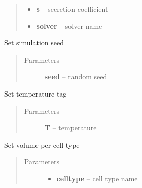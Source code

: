 \documentclass[letterpaper,10pt,english]{sphinxmanual}
\begin{document}
\begin{fulllineitems}
\begin{fulllineitems}
\begin{quote}
\begin{description}
\begin{itemize}
\item {} 
\textbf{s} -- secretion coefficient

\item {} 
\textbf{solver} -- solver name

\end{itemize}

\end{description}\end{quote}

\end{fulllineitems}


\begin{fulllineitems}
\label{Experiment:Experiment.Experiment.setSeed}
Set simulation seed
\begin{quote}\begin{description}
\item[{Parameters}] \leavevmode
\textbf{seed} -- random seed

\end{description}\end{quote}

\end{fulllineitems}


\begin{fulllineitems}
\label{Experiment:Experiment.Experiment.setTemp}
Set temperature tag
\begin{quote}\begin{description}
\item[{Parameters}] \leavevmode
\textbf{T} -- temperature

\end{description}\end{quote}

\end{fulllineitems}


\begin{fulllineitems}
\label{Experiment:Experiment.Experiment.setVolume}
Set volume per cell type
\begin{quote}\begin{description}
\item[{Parameters}] \leavevmode\begin{itemize}
\item {} 
\textbf{celltype} -- cell type name


\end{itemize}
\end{description}
\end{quote}
\end{fulllineitems}
\end{fulllineitems}
\end{document}
